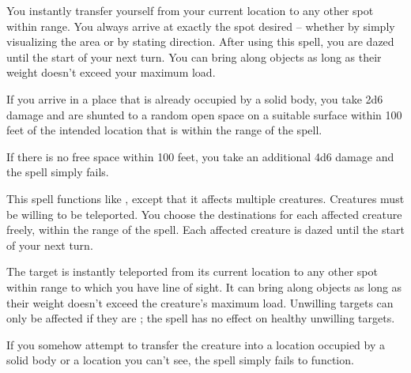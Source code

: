 \begin{spelleffect}
    You instantly transfer yourself from your current location to any other spot within range. You always arrive at exactly the spot desired -- whether by simply visualizing the area or by stating direction. After using this spell, you are dazed until the start of your next turn. You can bring along objects as long as their weight doesn't exceed your maximum load.
\end{spelleffect}
\begin{spellnotes}
    \par If you arrive in a place that is already occupied by a solid body, you take 2d6 damage and are shunted to a random open space on a suitable surface within 100 feet of the intended location that is within the range of the spell.
    \par  If there is no free space within 100 feet, you take an additional 4d6 damage and the spell simply fails.
\end{spellnotes}

\begin{spelleffect}
    This spell functions like , except that it affects multiple creatures. Creatures must be willing to be teleported. You choose the destinations for each affected creature freely, within the range of the spell. Each affected creature is dazed until the start of your next turn.
\end{spelleffect}

\begin{spelleffect}
    The target is instantly teleported from its current location to any other spot within range to which you have line of sight. It can bring along objects as long as their weight doesn't exceed the creature's maximum load. Unwilling targets can only be affected if they are \bloodied; the spell has no effect on healthy unwilling targets.
\end{spelleffect}
\begin{spellnotes}
    If you somehow attempt to transfer the creature into a location occupied by a solid body or a location you can't see, the spell simply fails to function.
\end{spellnotes}

